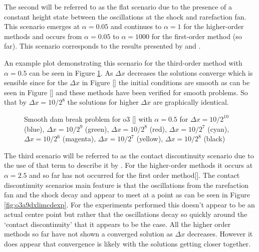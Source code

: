 \documentclass[SingleSpace,12pt,Proceedings]{Serre_ASCE}
\begin{document}
The second will be referred to as the flat scenario due to the presence of a constant height state between the oscillations at the shock and rarefaction fan. This scenario emerges at $\alpha = 0.05 $ and continues to $\alpha = 1$ for the higher-order methods and occurs from $\alpha = 0.05 $ to $\alpha = 1000 $ for the first-order method (so far). This scenario corresponds to the results presented by  and . 

An example plot demonstrating this scenario for the third-order method with $\alpha = 0.5$ can be seen in Figure \ref{fig:o3a6dxlimflatexp}. As $\Delta x$ decreases the solutions converge which is sensible since for the $\Delta x$ in Figure [] the initial conditions are smooth as can be seen in Figure [] and these methods have been verified for smooth problems. So that by $\Delta x = 10 / 2^8$ the solutions for higher $\Delta x$ are graphically identical. 

\begin{figure}
\centering
\caption{Smooth dam break problem for o3 [] with $\alpha = 0.5$ for $\Delta x = 10/2^{10}$ (blue), $\Delta x = 10/2^9$ (green), $\Delta x = 10/2^8$ (red), $\Delta x = 10/2^7$ (cyan), $\Delta x = 10/2^6$ (magenta), $\Delta x = 10/2^7$ (yellow), $\Delta x = 10/2^{8}$ (black)}
\label{fig:o3a6dxlimflatexp}
\end{figure}

The third scenario will be referred to as the contact discontinuity scenario due to the use of that term to describe it by . For the higher-order methods it occurs at $\alpha = 2.5$ and so far has not occurred for the first order method[]. The contact discontinuity scenarios main feature is that the oscillations from the rarefaction fan and the shock decay and appear to meet at a point as can be seen in Figure \ref{fig:o3a9dxlimcdexp}. For the experiments performed this doesn't appear to be an actual centre point but rather that the oscillations decay so quickly around the `contact discontinuity' that it appears to be the case. All the higher order methods so far have not shown a converged solution as $\Delta x$ decreases. However it does appear that convergence is likely with the solutions getting closer together. 
\end{document}
